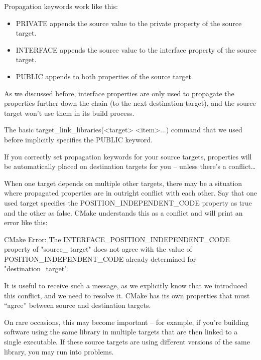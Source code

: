 
Propagation keywords work like this:

\begin{itemize}
\item
PRIVATE appends the source value to the private property of the source target.

\item
INTERFACE appends the source value to the interface property of the source target.

\item
PUBLIC appends to both properties of the source target.
\end{itemize}

As we discussed before, interface properties are only used to propagate the properties further down the chain (to the next destination target), and the source target won’t use them in its build process.

The basic target\_link\_libraries(<target> <item>...) command that we used before implicitly specifies the PUBLIC keyword.

If you correctly set propagation keywords for your source targets, properties will be automatically placed on destination targets for you – unless there’s a conflict…


When one target depends on multiple other targets, there may be a situation where propagated properties are in outright conflict with each other. Say that one used target specifies the POSITION\_INDEPENDENT\_CODE property as true and the other as false. CMake understands this as a conflict and will print an error like this:

\begin{shell}
CMake Error: The INTERFACE_POSITION_INDEPENDENT_CODE property of "source_ target" does not agree with the value of POSITION_INDEPENDENT_CODE already determined for "destination_target".
\end{shell}

It is useful to receive such a message, as we explicitly know that we introduced this conflict, and we need to resolve it. CMake has its own properties that must “agree” between source and destination targets.

On rare occasions, this may become important – for example, if you’re building software using the same library in multiple targets that are then linked to a single executable. If these source targets are using different versions of the same library, you may run into problems.

